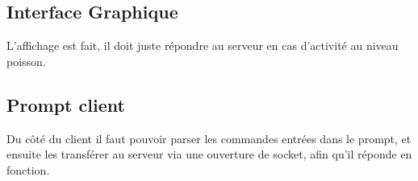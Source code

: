 \documentclass[a4paper,11pts]{article}
\begin{document}
\subsection{Interface Graphique}

L'affichage est fait, il doit juste répondre au serveur en cas d'activité au niveau poisson.

\subsection{Prompt client}

Du c\^oté du client il faut pouvoir parser les commandes entrées dans le prompt, et ensuite les transférer au serveur via une ouverture de socket, afin qu'il réponde en fonction.
\end{document}
